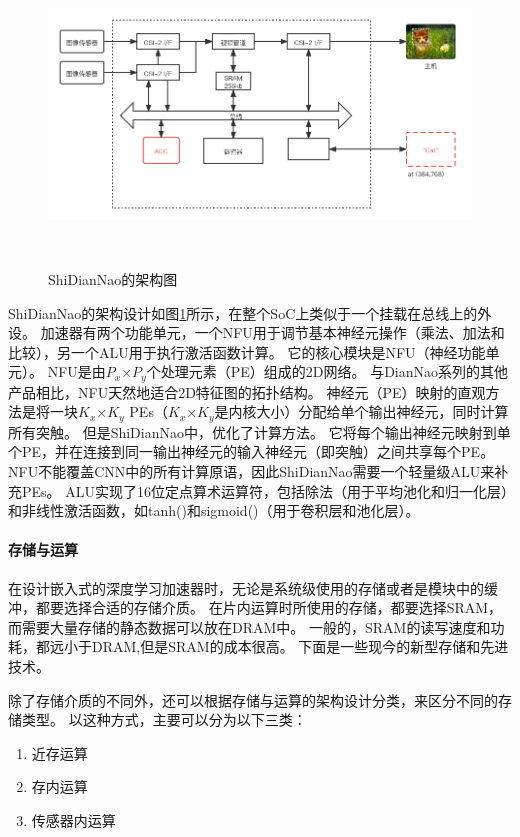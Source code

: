 \begin{figure}[htbp]
    \centering
    \includegraphics[width=15cm,height=8cm]{figures/ShiDianNao_arch.png}
    \caption{ShiDianNao的架构图}
    \label{fig:shidiannao_arch}
\end{figure}
ShiDianNao的架构设计如图\ref{fig:shidiannao_arch}所示\cite{2015ShiDianNao}，在整个SoC上类似于一个挂载在总线上的外设。
加速器有两个功能单元，一个NFU用于调节基本神经元操作（乘法、加法和比较），另一个ALU用于执行激活函数计算。
它的核心模块是NFU（神经功能单元）。
NFU是由$P_x$×$P_y$个处理元素（PE）组成的2D网络。
与DianNao系列的其他产品相比，NFU天然地适合2D特征图的拓扑结构。  
神经元（PE）映射的直观方法是将一块$K_x$×$K_y$ PEs（$K_x$×$K_y$是内核大小）分配给单个输出神经元，同时计算所有突触。
但是ShiDianNao中，优化了计算方法。
它将每个输出神经元映射到单个PE，并在连接到同一输出神经元的输入神经元（即突触）之间共享每个PE。  
NFU不能覆盖CNN中的所有计算原语，因此ShiDianNao需要一个轻量级ALU来补充PEs。
ALU实现了16位定点算术运算符，包括除法（用于平均池化和归一化层）和非线性激活函数，如tanh()和sigmoid()（用于卷积层和池化层）。


\paragraph{存储与运算}
在设计嵌入式的深度学习加速器时，无论是系统级使用的存储或者是模块中的缓冲，都要选择合适的存储介质。
在片内运算时所使用的存储，都要选择SRAM，而需要大量存储的静态数据可以放在DRAM中。
一般的，SRAM的读写速度和功耗，都远小于DRAM,但是SRAM的成本很高。
下面是一些现今的新型存储和先进技术。  


除了存储介质的不同外，还可以根据存储与运算的架构设计分类，来区分不同的存储类型。
以这种方式，主要可以分为以下三类：
\begin{enumerate}
    \item 近存运算
    \item 存内运算
    \item 传感器内运算
\end{enumerate}   


